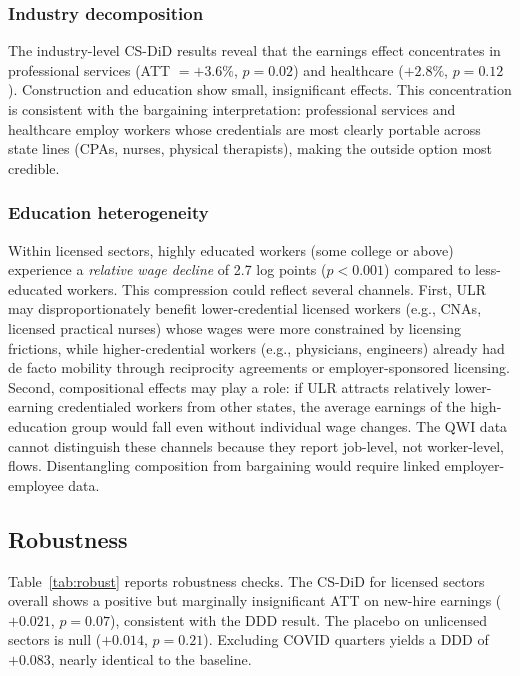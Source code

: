 \documentclass[12pt]{article}
\begin{document}
\subsubsection*{Industry decomposition} The industry-level CS-DiD results reveal that the earnings effect concentrates in professional services (ATT $= +3.6\%$, $p = 0.02$) and healthcare ($+2.8\%$, $p = 0.12$). Construction and education show small, insignificant effects. This concentration is consistent with the bargaining interpretation: professional services and healthcare employ workers whose credentials are most clearly portable across state lines (CPAs, nurses, physical therapists), making the outside option most credible.

\subsubsection*{Education heterogeneity} Within licensed sectors, highly educated workers (some college or above) experience a \emph{relative wage decline} of 2.7 log points ($p < 0.001$) compared to less-educated workers. This compression could reflect several channels. First, ULR may disproportionately benefit lower-credential licensed workers (e.g., CNAs, licensed practical nurses) whose wages were more constrained by licensing frictions, while higher-credential workers (e.g., physicians, engineers) already had de facto mobility through reciprocity agreements or employer-sponsored licensing. Second, compositional effects may play a role: if ULR attracts relatively lower-earning credentialed workers from other states, the average earnings of the high-education group would fall even without individual wage changes. The QWI data cannot distinguish these channels because they report job-level, not worker-level, flows. Disentangling composition from bargaining would require linked employer-employee data.

\subsection{Robustness}



Table~\ref{tab:robust} reports robustness checks. The CS-DiD for licensed sectors overall shows a positive but marginally insignificant ATT on new-hire earnings ($+0.021$, $p = 0.07$), consistent with the DDD result. The placebo on unlicensed sectors is null ($+0.014$, $p = 0.21$). Excluding COVID quarters yields a DDD of $+0.083$, nearly identical to the baseline.
\end{document}

